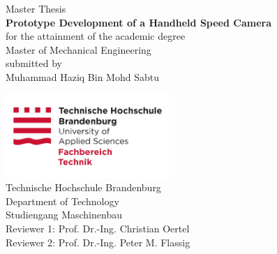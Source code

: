 \begin{titlepage}
    \begin{center}

        \vspace*{20mm}
        {\normalsize Master Thesis}\\[2mm]
        {\Large \textbf {Prototype Development of a Handheld Speed Camera}}\\[5mm]

        {\small \normalfont
        for the attainment of the academic degree\\
        Master of Mechanical Engineering\\
        submitted by}\\[5mm]

        \large Muhammad Haziq Bin Mohd Sabtu

        \vspace*{12mm}
        \small


        \vspace*{10mm}
        \includegraphics[height=120px]{texs/pre/image/THB_FB-T_Logo.jpg}\\
        \small
        Technische Hochschule Brandenburg\\
        Department of  Technology\\
        Studiengang Maschinenbau\\
        Reviewer 1: Prof. Dr.-Ing. Christian Oertel\\
        Reviewer 2: Prof. Dr.-Ing. Peter M. Flassig\\

    \end{center}
\end{titlepage}
